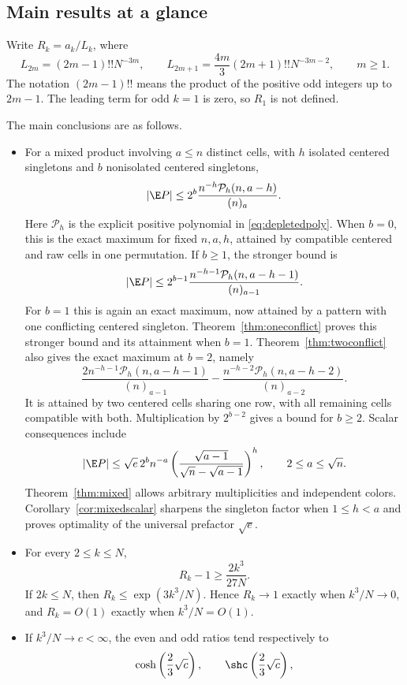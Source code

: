\subsection{Main results at a glance}

Write $R_k=a_k/L_k$, where
\begin{equation}\label{eq:leading}
L_{2m}=(2m-1)!!N^{-3m},\qquad
L_{2m+1}=\frac{4m}{3}(2m+1)!!N^{-3m-2},\qquad m\ge1.
\end{equation}
The notation $(2m-1)!!$ means the product of the positive odd integers up to $2m-1$. The leading term for odd $k=1$ is zero, so $R_1$ is not defined.

The main conclusions are as follows.
\begin{itemize}
\item For a mixed product involving $a\le n$ distinct cells, with $h$ isolated centered singletons and $b$ nonisolated centered singletons,
\[
|\E P|\le2^b\frac{n^{-h}\mathcal P_h(n,a-h)}{(n)_a}.
\]
Here $\mathcal P_h$ is the explicit positive polynomial in \eqref{eq:depletedpoly}. When $b=0$, this is the exact maximum for fixed $n,a,h$, attained by compatible centered and raw cells in one permutation. If $b\ge1$, the stronger bound is
\[
|\E P|\le2^{b-1}\frac{n^{-h-1}\mathcal P_h(n,a-h-1)}{(n)_{a-1}}.
\]
For $b=1$ this is again an exact maximum, now attained by a pattern with one conflicting centered singleton. Theorem~\ref{thm:oneconflict} proves this stronger bound and its attainment when $b=1$. Theorem~\ref{thm:twoconflict} also gives the exact maximum at $b=2$, namely
\[
\frac{2n^{-h-1}\mathcal P_h(n,a-h-1)}{(n)_{a-1}}
-\frac{n^{-h-2}\mathcal P_h(n,a-h-2)}{(n)_{a-2}}.
\]
It is attained by two centered cells sharing one row, with all remaining cells compatible with both. Multiplication by $2^{b-2}$ gives a bound for $b\ge2$. Scalar consequences include
\[
|\E P|\le\sqrt e\,2^b n^{-a}
\left(\frac{\sqrt{a-1}}{\sqrt n-\sqrt{a-1}}\right)^h,
\qquad 2\le a\le\sqrt n.
\]
Theorem~\ref{thm:mixed} allows arbitrary multiplicities and independent colors. Corollary~\ref{cor:mixedscalar} sharpens the singleton factor when $1\le h<a$ and proves optimality of the universal prefactor $\sqrt e$.
\item For every $2\le k\le N$,
\[
R_k-1\ge\frac{2k^3}{27N}.
\]
If $2k\le N$, then $R_k\le\exp(3k^3/N)$. Hence $R_k\to1$ exactly when $k^3/N\to0$, and $R_k=O(1)$ exactly when $k^3/N=O(1)$.
\item If $k^3/N\to c<\infty$, the even and odd ratios tend respectively to
\[
\cosh\left(\frac23\sqrt c\right),\qquad
\shc\left(\frac23\sqrt c\right),
\]
\end{itemize}
